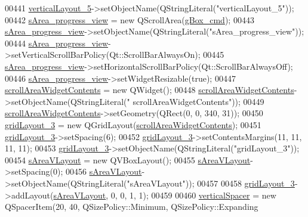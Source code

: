 \begin{DoxyCode}
00441         \hyperlink{a00027_afcc20a3d5058037a00cdc6122f231848}{verticalLayout\_5}->setObjectName(QStringLiteral(\textcolor{stringliteral}{"verticalLayout\_5"}));
00442         \hyperlink{a00027_ae4fe44aa026dd0e84e0f10cdcabca504}{sArea\_progress\_view} = \textcolor{keyword}{new} QScrollArea(\hyperlink{a00027_ad5c6667239e28060ba3b04ee0db97bac}{gBox\_cmd});
00443         \hyperlink{a00027_ae4fe44aa026dd0e84e0f10cdcabca504}{sArea\_progress\_view}->setObjectName(QStringLiteral(\textcolor{stringliteral}{"sArea\_progress\_view"}));
00444         \hyperlink{a00027_ae4fe44aa026dd0e84e0f10cdcabca504}{sArea\_progress\_view}->setVerticalScrollBarPolicy(Qt::ScrollBarAlwaysOn);
00445         \hyperlink{a00027_ae4fe44aa026dd0e84e0f10cdcabca504}{sArea\_progress\_view}->setHorizontalScrollBarPolicy(Qt::ScrollBarAlwaysOff);
00446         \hyperlink{a00027_ae4fe44aa026dd0e84e0f10cdcabca504}{sArea\_progress\_view}->setWidgetResizable(\textcolor{keyword}{true});
00447         \hyperlink{a00027_aa70fc2af9f9ea3b686db12823c5deb47}{scrollAreaWidgetContents} = \textcolor{keyword}{new} QWidget();
00448         \hyperlink{a00027_aa70fc2af9f9ea3b686db12823c5deb47}{scrollAreaWidgetContents}->setObjectName(QStringLiteral(\textcolor{stringliteral}{"
      scrollAreaWidgetContents"}));
00449         \hyperlink{a00027_aa70fc2af9f9ea3b686db12823c5deb47}{scrollAreaWidgetContents}->setGeometry(QRect(0, 0, 340, 31));
00450         \hyperlink{a00027_af42ea7d4c2e893181caad21e28166932}{gridLayout\_3} = \textcolor{keyword}{new} QGridLayout(\hyperlink{a00027_aa70fc2af9f9ea3b686db12823c5deb47}{scrollAreaWidgetContents});
00451         \hyperlink{a00027_af42ea7d4c2e893181caad21e28166932}{gridLayout\_3}->setSpacing(6);
00452         \hyperlink{a00027_af42ea7d4c2e893181caad21e28166932}{gridLayout\_3}->setContentsMargins(11, 11, 11, 11);
00453         \hyperlink{a00027_af42ea7d4c2e893181caad21e28166932}{gridLayout\_3}->setObjectName(QStringLiteral(\textcolor{stringliteral}{"gridLayout\_3"}));
00454         \hyperlink{a00027_a2bdce9ad313cd4ee575613f36cbc4678}{sAreaVLayout} = \textcolor{keyword}{new} QVBoxLayout();
00455         \hyperlink{a00027_a2bdce9ad313cd4ee575613f36cbc4678}{sAreaVLayout}->setSpacing(0);
00456         \hyperlink{a00027_a2bdce9ad313cd4ee575613f36cbc4678}{sAreaVLayout}->setObjectName(QStringLiteral(\textcolor{stringliteral}{"sAreaVLayout"}));
00457 
00458         \hyperlink{a00027_af42ea7d4c2e893181caad21e28166932}{gridLayout\_3}->addLayout(\hyperlink{a00027_a2bdce9ad313cd4ee575613f36cbc4678}{sAreaVLayout}, 0, 0, 1, 1);
00459 
00460         \hyperlink{a00027_a8384329c3663ff274e926a12024aab52}{verticalSpacer} = \textcolor{keyword}{new} QSpacerItem(20, 40, QSizePolicy::Minimum, QSizePolicy::Expanding

\end{DoxyCode}
